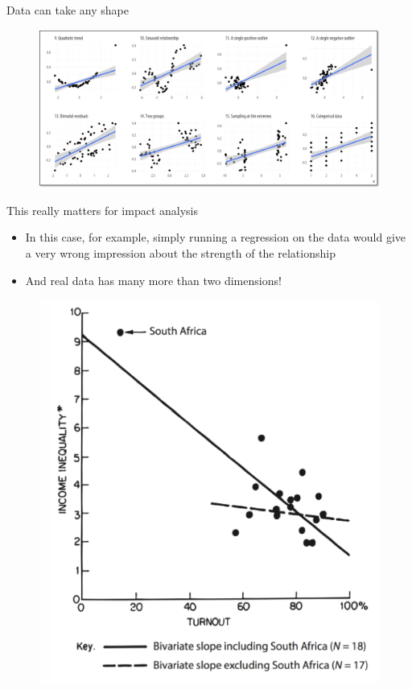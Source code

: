 \documentclass[aspectratio=169]{beamer}
\begin{document}
\begin{frame}{Data can take any shape}
\begin{figure}
	\centering
	\includegraphics[width=\linewidth]{img/datashape}
\end{figure}
\end{frame}

\begin{frame}[fragile]{This really matters for impact analysis}
\begin{multicols}{2}	
	\begin{itemize}
		\item In this case, for example, simply running a regression on the data would give a very wrong impression about the strength of the relationship 
		\item And real data has many more than two dimensions!
	\end{itemize}
	\begin{figure}
		\centering
		\includegraphics[width=\linewidth]{img/incomeinequality}
	\end{figure}
\end{multicols}
\end{frame}
\end{document}
